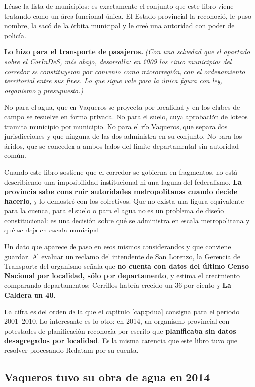 Léase la lista de municipios: es exactamente el conjunto que este libro viene tratando como un área funcional única. El Estado provincial la reconoció, le puso nombre, la sacó de la órbita municipal y le creó una autoridad con poder de policía.

\textbf{Lo hizo para el transporte de pasajeros.} \textit{(Con una salvedad que el apartado sobre el CorInDeS, más abajo, desarrolla: en 2009 los cinco municipios del corredor se constituyeron por convenio como microrregión, con el ordenamiento territorial entre sus fines. Lo que sigue vale para la única figura con ley, organismo y presupuesto.)}

No para el agua, que en Vaqueros se proyecta por localidad y en los clubes de campo se resuelve en forma privada. No para el suelo, cuya aprobación de loteos tramita municipio por municipio. No para el río Vaqueros, que separa dos jurisdicciones y que ninguna de las dos administra en su conjunto. No para los áridos, que se conceden a ambos lados del límite departamental sin autoridad común.

Cuando este libro sostiene que el corredor se gobierna en fragmentos, no está describiendo una imposibilidad institucional ni una laguna del federalismo. \textbf{La provincia sabe construir autoridades metropolitanas cuando decide hacerlo}, y lo demostró con los colectivos. Que no exista una figura equivalente para la cuenca, para el suelo o para el agua no es un problema de diseño constitucional: es una decisión sobre qué se administra en escala metropolitana y qué se deja en escala municipal.

Un dato que aparece de paso en esos mismos considerandos y que conviene guardar. Al evaluar un reclamo del intendente de San Lorenzo, la Gerencia de Transporte del organismo señala que \textbf{no cuenta con datos del último Censo Nacional por localidad, sólo por departamento}, y estima el crecimiento comparando departamentos: Cerrillos habría crecido un 36 por ciento y \textbf{La Caldera un 40}.

La cifra es del orden de la que el capítulo \ref{cap:pdua} consigna para el período 2001--2010. Lo interesante es lo otro: en 2014, un organismo provincial con potestades de planificación reconocía por escrito que \textbf{planificaba sin datos desagregados por localidad}. Es la misma carencia que este libro tuvo que resolver procesando Redatam por su cuenta.

\subsection*{Vaqueros tuvo su obra de agua en 2014}

